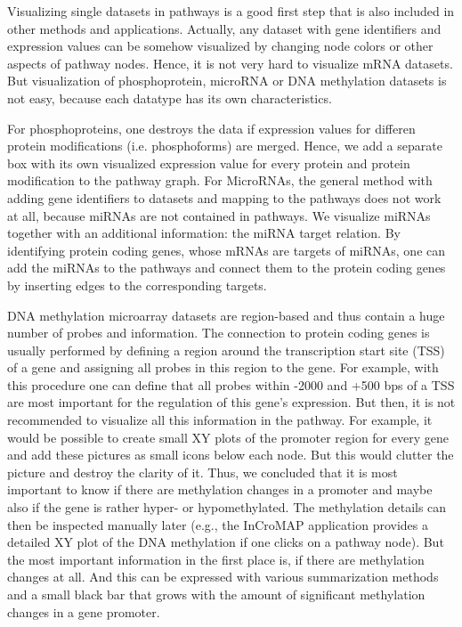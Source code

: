 \documentclass{bioinfo}
\begin{document}
Visualizing single datasets in pathways is a good first step that is also included
in other methods and applications. Actually, any dataset with gene identifiers and expression values
can be somehow visualized by changing node colors or other aspects of pathway nodes. Hence, it is
not very hard to visualize mRNA datasets. But visualization of phosphoprotein, microRNA or DNA
methylation datasets is not easy, because each datatype has its own characteristics.

For phosphoproteins, one destroys the data if expression values for differen protein modifications
(i.e. phosphoforms) are merged. Hence, we add a separate box with its own visualized expression
value for every protein and protein modification to the pathway graph.
%
For MicroRNAs, the general method with adding gene identifiers to datasets and mapping to the
pathways does not work at all, because miRNAs are not contained in pathways. We visualize miRNAs
together with an additional information: the miRNA target relation. By identifying protein coding
genes, whose mRNAs are targets of miRNAs, one can add the miRNAs to the pathways and connect them to
the protein coding genes by inserting edges to the corresponding targets.

DNA methylation microarray datasets are region-based and thus contain a huge number of probes and
information. The connection to protein coding genes is usually performed by defining a region around
the transcription start site (TSS) of a gene and assigning all probes in this region to the gene.
%
For example, with this procedure one can define that all probes within -2000 and +500 bps of a TSS
are most important for the regulation of this gene's expression.  But then, it is not recommended to
visualize all this information in the pathway. For example, it would be possible to create small XY
plots of the promoter region for every gene and add these pictures as small icons below each
node. But this would clutter the picture and destroy the clarity of it. Thus, we concluded that it
is most important to know if there are methylation changes in a promoter and maybe also if the gene
is rather hyper- or hypomethylated. The methylation details can then be inspected manually later
(e.g., the InCroMAP application provides a detailed XY plot of the DNA methylation if one clicks on
a pathway node). But the most important information in the first place is, if there are methylation
changes at all. And this can be expressed with various summarization methods and a small black bar
that grows with the amount of significant methylation changes in a gene promoter.
\end{document}
